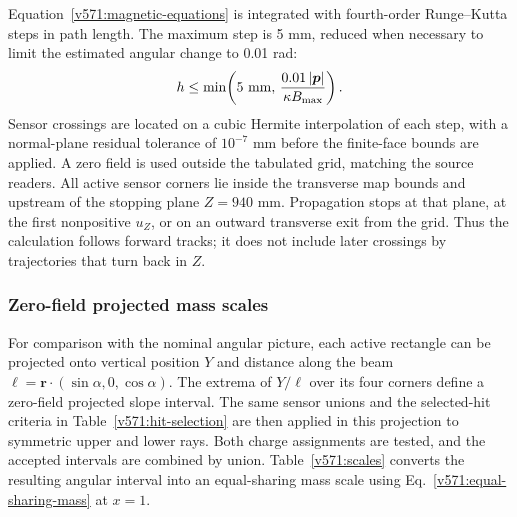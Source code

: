 Equation~\eqref{v571:magnetic-equations} is integrated with fourth-order
Runge--Kutta steps in path length. The maximum step is 5 mm, reduced when
necessary to limit the estimated angular change to 0.01 rad:
\begin{equation}
 h\leq\min\!\left(5\ {\rm mm},\,
           \frac{0.01\,|\boldsymbol p|}{\kappa B_{\max}}\right).
 \label{v571:transport-step}
\end{equation}
Sensor crossings are located on a cubic Hermite interpolation of each step,
with a normal-plane residual tolerance of $10^{-7}$ mm before the finite-face
bounds are applied. A zero field is used outside the tabulated grid, matching
the source readers. All active sensor corners lie inside the transverse
map bounds and upstream of the stopping plane $Z=940$ mm. Propagation stops
at that plane, at the first nonpositive $u_Z$, or on an outward transverse
exit from the grid. Thus the calculation follows forward tracks; it does
not include later crossings by trajectories that turn back in $Z$.

\subsubsection{Zero-field projected mass scales}
\label{v571:projected-scales}
For comparison with the nominal angular picture, each active rectangle can
be projected onto vertical position $Y$ and distance along the beam
$\ell=\boldsymbol r\cdot(\sin\alpha,0,\cos\alpha)$.
The extrema of $Y/\ell$ over its four corners define a zero-field projected
slope interval.
The same sensor unions and the selected-hit criteria in
Table~\ref{v571:hit-selection} are then applied in this projection to
symmetric upper and lower rays. Both charge assignments are tested, and the
accepted intervals are combined by union. Table~\ref{v571:scales}
converts the resulting angular interval into an equal-sharing mass scale using
Eq.~\eqref{v571:equal-sharing-mass} at $x=1$.

\begin{table}[H]
\centering\small

\caption{Zero-field projected vertical aperture of the selected LCDD geometry with the
run-dependent hit requirements of Table~\ref{v571:hit-selection}.
The angular scan spacing is 0.002 mrad. These are
equal-sharing mass scales in a two-dimensional projection. They are not the
mass endpoints of the full geometry with magnetic transport.}
\label{v571:scales}
\end{table}

